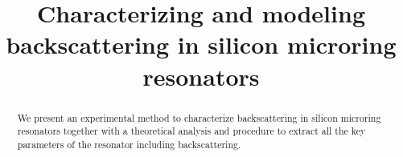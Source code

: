 \documentclass[conference,letterpaper,final]{IEEEtran}
\begin{document}
%
\title{Characterizing and modeling backscattering in silicon microring resonators}



\author{
}






\maketitle
{}

\begin{abstract}
We present an experimental method to characterize backscattering in silicon microring resonators together with a theoretical analysis and procedure to extract all the key parameters of the resonator including backscattering.
 
\end{abstract}





%
\IEEEpeerreviewmaketitle
\end{document}
